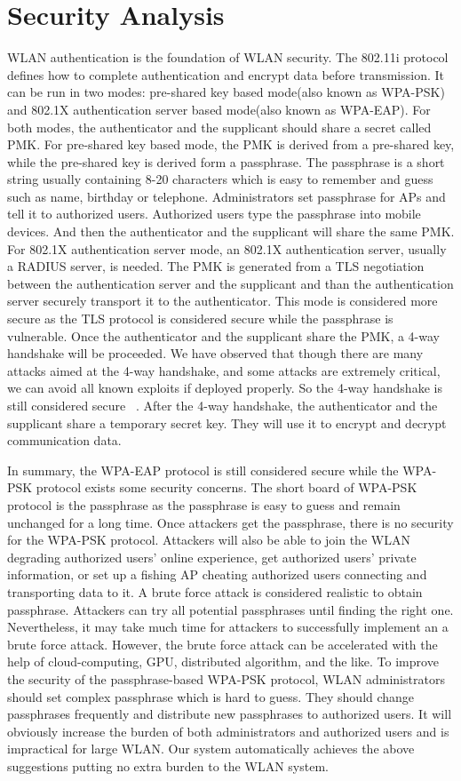 \section{Security Analysis}
WLAN authentication is the foundation of WLAN security. The 802.11i protocol defines how to complete authentication and encrypt data before transmission. It can be run in two modes: pre-shared key based mode(also known as WPA-PSK) and 802.1X authentication server based mode(also known as WPA-EAP). For both modes, the authenticator and the supplicant should share a secret called PMK. For pre-shared key based mode, the PMK is derived from a pre-shared key, while the pre-shared key is derived form a passphrase. The passphrase is a short string usually containing 8-20 characters which is easy to remember and guess such as name, birthday or telephone. Administrators set passphrase for APs and tell it to authorized users. Authorized users type the passphrase into mobile devices. And then the authenticator and the supplicant will share the same PMK. For 802.1X authentication server mode, an 802.1X authentication server, usually a RADIUS server, is needed. The PMK is generated from a TLS negotiation between the authentication server and the supplicant and than the authentication server securely transport it to the authenticator. This mode is considered more secure as the TLS protocol is considered secure while the passphrase is vulnerable. Once the authenticator and the supplicant share the PMK, a 4-way handshake will be proceeded. We have observed that though there are many attacks aimed at the 4-way handshake, and some attacks are extremely critical, we can avoid all known exploits if deployed properly. So the 4-way handshake is still considered secure~\cite{Liu2010Survey} . After the 4-way handshake, the authenticator and the supplicant share a temporary secret key. They will use it to encrypt and decrypt communication data. 


In summary, the WPA-EAP protocol is still considered secure while the WPA-PSK protocol exists some security concerns. The short board of WPA-PSK protocol is the passphrase as the passphrase is easy to guess and remain unchanged for a long time. Once attackers get the passphrase, there is no security for the WPA-PSK protocol. Attackers will also be able to join the WLAN degrading authorized users’ online experience, get authorized users’ private information, or set up a fishing AP cheating authorized users connecting and transporting data to it. A brute force attack is considered realistic to obtain passphrase. Attackers can try all potential passphrases until finding the right one. Nevertheless, it may take much time for attackers to successfully implement an a brute force attack. However, the brute force attack can be accelerated with the help of cloud-computing, GPU, distributed algorithm, and the like. To improve the security of the passphrase-based WPA-PSK protocol, WLAN administrators should set complex passphrase which is hard to guess. They should change passphrases frequently and distribute new passphrases to authorized users. It will obviously increase the burden of both administrators and authorized users and is impractical for large WLAN. Our system automatically achieves the above suggestions putting no extra burden to the WLAN system. 



